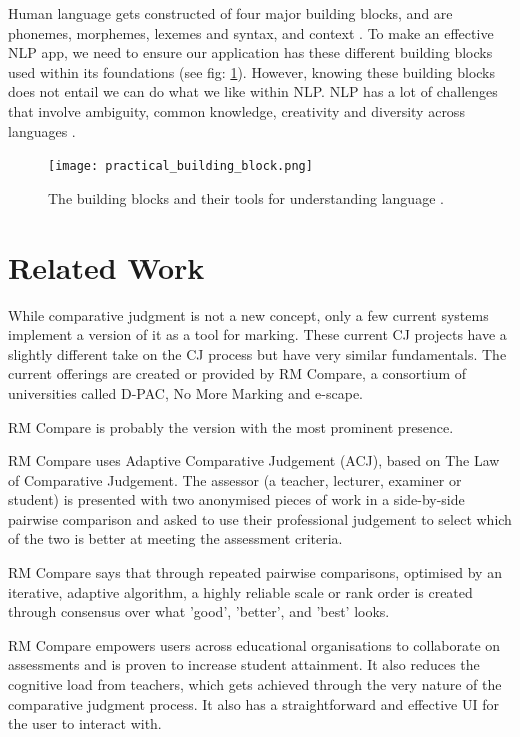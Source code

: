 	Human language gets constructed of four major building blocks, and are phonemes, morphemes, lexemes and syntax, and context \cite{vajjala2020practical}. To make an effective NLP app, we need to ensure our application has these different building blocks used within its foundations (see fig: \ref{fig:practical_building_block}). However, knowing these building blocks does not entail we can do what we like within NLP. NLP has a lot of challenges that involve ambiguity, common knowledge, creativity and diversity across languages \cite{vajjala2020practical}. 
	
	\begin{figure}[t]
		\centering
		\texttt{[image: practical\_building\_block.png]}
		\caption{The building blocks and their tools for understanding language \cite{vajjala2020practical}.}
		\label{fig:practical_building_block}
		
	\end{figure} 
	
	\section{Related Work}
		\label{sec:google_fu}
		
		While comparative judgment is not a new concept, only a few current systems implement a version of it as a tool for marking. These current CJ projects have a slightly different take on the CJ process but have very similar fundamentals. The current offerings are created or provided by RM Compare, a consortium of universities called D-PAC, No More Marking and e-scape.
		
		RM Compare is probably the version with the most prominent presence. 
		
		RM Compare uses Adaptive Comparative Judgement (ACJ), based on The Law of Comparative Judgement. The assessor (a teacher, lecturer, examiner or student) is presented with two anonymised pieces of work in a side-by-side pairwise comparison and asked to use their professional judgement to select which of the two is better at meeting the assessment criteria.
		
		RM Compare says that through repeated pairwise comparisons, optimised by an iterative, adaptive algorithm, a highly reliable scale or rank order is created through consensus over what 'good', 'better', and 'best' looks.
		
		RM Compare empowers users across educational organisations to collaborate on assessments and is proven to increase student attainment. It also reduces the cognitive load from teachers, which gets achieved through the very nature of the comparative judgment process. It also has a straightforward and effective UI for the user to interact with.
	

